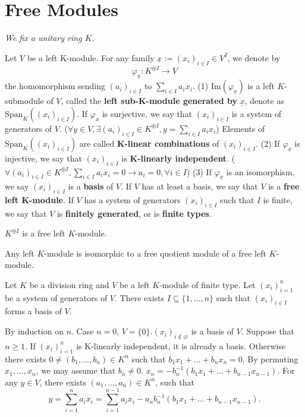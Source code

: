 \section{Free Modules}
\textit{We fix a unitary ring $K$.}
\begin{definitionenv}
    Let $V$ be a left K-module. For any family $\underline{x}:=\left(x_i\right)_{i\in I}\in V^I$, we denote by 
    $$\varphi_{\underline{x}}:K^{\oplus I}\longrightarrow V$$
    the homomorphism sending $(a_i)_{i\in I}$ to $\sum_{i\in I}a_ix_i.$
    \newline
    (1) $\mathrm{Im}\left(\varphi_{\underline{x}}\right)$ is a left $K$-submodule of $V$, called the \textbf{left sub-K-module generated by }$\underline{x}$, denote as $\mathrm{Span}_{K}\left((x_i)_{i\in I}\right)$. If $\varphi_{x}$ is surjective, we say that $(x_i)_{i\in I}$ is a system of generators of $V$.
    ($\forall y\in V,\exists (a_i)_{i\in I}\in K^{\oplus I}, y=\sum_{i\in I}a_ix_i$) Elements of $\mathrm{Span}_K\left((x_i)_{i\in I}\right)$ are called \textbf{K-linear combinations} of $(x_i)_{i\in I}$.
    \newline
    (2) If $\varphi_{\underline{x}}$ is injective, we say that $(x_i)_{i\in I}$ is \textbf{K-linearly independent}. ($\forall (a_i)_{i\in I}\in K^{\oplus I},\sum_{i\in I}a_ix_i=0\rightarrow a_i=0,\forall i\in I$)
    \newline
    (3) If $\varphi_{\underline{x}}$ is an isomorphism, we say $(x_i)_{i\in I}$ is a \textbf{basis} of $V$. If $V$ has at least a basis, we say that $V$ is a \textbf{free left K-module}. If $V$ has a system of generators $(x_i)_{i\in I}$ such that $I$ is finite, we say that $V$ is \textbf{finitely generated}, or is \textbf{finite types}.
\end{definitionenv}
\begin{exampleenv}
    $K^{\oplus I}$ is a free left $K$-module.
\end{exampleenv}
\begin{remark}
    Any left $K$-module is isomorphic to a free quotient module of a free left $K$-module.
\end{remark}
\begin{theoremenv}\label{6.10.4}
    Let $K$ be a division ring and $V$ be a left $K$-module of finite type. Let $(x_i)_{i=1}^n$ be a system of generators of $V$. There exists $I\subseteq\{1,\dots,n\}$ such that $(x_i)_{i\in I}$ forms a basis of $V$.
\end{theoremenv}
\begin{proofenv}
    By induction on $n$.
    \newline
    Case $n=0$, $V=\{0\}. (x_i)_{i\not\in \varnothing}$ is a basis of $V$. Suppose that $n\geq1$. If $(x_i)_{i=1}^n$  is K-linearly independent, it is already a basis. Otherwise there exists $0\not=(b_1,\dots,b_n)\in K^n$ such  that $b_1x_1+\dots+b_nx_n=0.$ By permuting $x_1,\dots,x_n$, we may assume that $b_n\not=0$. $x_n=-b_n^{-1}(b_1x_1+\dots+b_{n-1}x_{n-1})$. For any $y\in V$, there exists $(a_1,\dots,a_n)\in K^n$, such that 
    $$y=\sum_{i=1}^{n}a_ix_i=\sum_{i=1}^{n-1}a_ix_i-a_nb_n^{-1}\left(b_1x_1+\dots+b_{n-1}x_{n-1}\right).$$
\end{proofenv}
